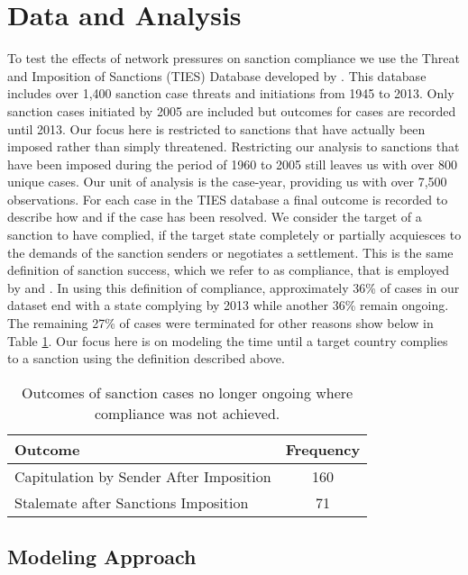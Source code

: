 \section*{Data and Analysis}
\label{empirics}

To test the effects of network pressures on sanction compliance we use the Threat and Imposition of Sanctions (TIES) Database developed by \citet{morgan2009threat}. This database includes over 1,400 sanction case threats and initiations from 1945 to 2013. Only sanction cases initiated by 2005 are included but outcomes for cases are recorded until 2013. Our focus here is restricted to sanctions that have actually been imposed rather than simply threatened. Restricting our analysis to sanctions that have been imposed during the period of 1960 to 2005 still leaves us with over 800 unique cases. Our unit of analysis is the case-year, providing us with over 7,500 observations. For each case in the TIES database a final outcome is recorded to describe how and if the case has been resolved. We consider the target of a sanction to have complied, if the target state completely or partially acquiesces to the demands of the sanction senders or negotiates a settlement. This is the same definition of sanction success, which we refer to as compliance, that is employed by \citet{bapat2009multilateral} and \citet{bapat2013determinants}. In using this definition of compliance, approximately 36\% of cases in our dataset end with a state complying by 2013 while another 36\% remain ongoing. The remaining 27\% of cases were terminated for other reasons show below in Table \ref{tab:termCases}. Our focus here is on modeling the time until a target country complies to a sanction using the definition described above. 

\begin{table}[ht]
	\centering
	\begin{tabular}{lc}
		\hline\hline
		Outcome & Frequency \\
		\hline
		Capitulation by Sender After Imposition & 160 \\
		Stalemate after Sanctions Imposition & 71 \\
		\hline\hline
	\end{tabular}
	\caption{Outcomes of sanction cases no longer ongoing where compliance was not achieved.}
	\label{tab:termCases}	
\end{table}

\subsection*{Modeling Approach} 

